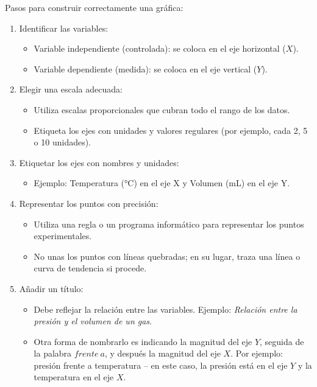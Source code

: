 Pasos para construir correctamente una gráfica:

\begin{enumerate}[label=\numberballmDarkTeal]
        \item  Identificar las variables:
        \begin{itemize}
            \item Variable independiente (controlada): se coloca en el eje horizontal (\( X \)).
            \item Variable dependiente (medida): se coloca en el eje vertical (\( Y \)).
        \end{itemize}
        \item Elegir una escala adecuada:
        \begin{itemize}
            \item Utiliza escalas proporcionales que cubran todo el rango de los datos.
            \item Etiqueta los ejes con unidades y valores regulares (por ejemplo, cada 2, 5 o 10 unidades).
        \end{itemize}
        \item Etiquetar los ejes con nombres y unidades:
        \begin{itemize}
            \item Ejemplo: Temperatura (°C) en el eje X y Volumen (mL) en el eje Y.
        \end{itemize}
        \item Representar los puntos con precisión:
        \begin{itemize}
            \item Utiliza una regla o un programa informático para representar los puntos experimentales.
            \item No unas los puntos con líneas quebradas; en su lugar, traza una línea o curva de tendencia si procede.
        \end{itemize}
        \item  Añadir un título:
        \begin{itemize}
            \item Debe reflejar la relación entre las variables.
            Ejemplo: \textit{Relación entre la presión y el volumen de un gas}.
            \item Otra forma de nombrarlo es indicando la magnitud del eje \( Y \), seguida de la palabra \( frente\ a \), y después la magnitud del eje \( X \).
            Por ejemplo: presión frente a temperatura – en este caso, la presión está en el eje \( Y \) y la temperatura en el eje \( X \).

\end{itemize}
\end{enumerate}
